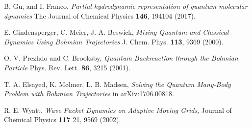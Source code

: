 \documentclass[nofootinbib, secnumarabic, amsmath, nobibnotes,11pt,aps,pra, floatfix]{revtex4-1}
\begin{document}
\begin{thebibliography}{999}
B. Gu, and I. Franco, \emph{Partial hydrodynamic representation of quantum molecular dynamics} The Journal of Chemical Physics \textbf{146},  194104 (2017).

E. Gindensperger, C. Meier, J. A. Beswick, \emph{Mixing Quantum and Classical Dynamics Using Bohmian Trajectories} J. Chem. Phys. \textbf{113},  9369 (2000).

O. V. Prezhdo and C. Brooksby, \emph{Quantum Backreaction through the Bohmian Particle} Phys. Rev. Lett. \textbf{86},  3215 (2001).

T. A. Elsayed, K. M\o lmer, L. B. Madsen, \emph{Solving the Quantum Many-Body Problem with Bohmian Trajectories} in arXiv:1706.00818.

R. E. Wyatt, \emph{Wave Packet Dynamics on Adaptive Moving Grids}, Journal of Chemical Physics \textbf{117} 21,  9569 (2002).
\end{thebibliography}
\end{document}
